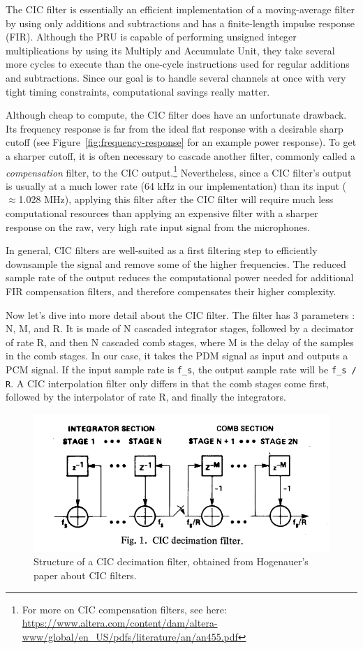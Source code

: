 \documentclass[]{report}
\begin{document}
The CIC filter is essentially an efficient implementation of a moving-average filter by using only additions and subtractions and has a finite-length impulse response (FIR). Although the PRU is capable of performing unsigned integer multiplications by using its Multiply and Accumulate Unit, they take several more cycles to execute than the one-cycle instructions used for regular additions and subtractions. Since our goal is to handle several channels at once with very tight timing constraints, computational savings really matter.

Although cheap to compute, the CIC filter does have an unfortunate drawback. Its frequency response is far from the ideal flat response with a desirable sharp cutoff (see Figure~\ref{fig:frequency-response} for an example power response). To get a sharper cutoff, it is often necessary to cascade another filter, commonly called a \emph{compensation} filter, to the CIC output.\footnote{For more on CIC compensation filters, see here: \url{https://www.altera.com/content/dam/altera-www/global/en_US/pdfs/literature/an/an455.pdf}} Nevertheless, since a CIC filter's output is usually at a much lower rate (64 kHz in our implementation) than its input ($ \approx $1.028 MHz), applying this filter after the CIC filter will require much less computational resources than applying an expensive filter with a sharper response on the raw, very high rate input signal from the microphones.


In general, CIC filters are well-suited as a first filtering step to efficiently downsample the signal and remove some of the higher frequencies. The reduced sample rate of the output reduces the computational power needed for additional FIR compensation filters, and therefore compensates their higher complexity.

Now let's dive into more detail about the CIC filter. The filter has 3 parameters : N, M, and R. It is made of N cascaded integrator stages, followed by a decimator of rate R, and then N cascaded comb stages, where M is the delay of the samples in the comb stages. In our case, it takes the PDM signal as input and outputs a PCM signal. If the input sample rate is \texttt{f\_s}, the output sample rate will be \texttt{f\_s / R}. A CIC interpolation filter only differs in that the comb stages come first, followed by the interpolator of rate R, and finally the integrators.

\begin{figure}[H]
\centering
\includegraphics[width=0.8\linewidth]{Pictures/CIC_structure.png}
\caption{Structure of a CIC decimation filter, obtained from Hogenauer's paper about CIC filters.}
\end{figure}
\end{document}
